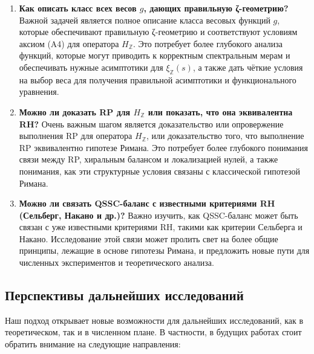 \documentclass{article}
\numberwithin{equation}{section}
\theoremstyle{plain}
\theoremstyle{definition}
\theoremstyle{remark}
\begin{document}
\begin{enumerate}[label=(\arabic*)]
    \item \textbf{Как описать класс всех весов \( g \), дающих правильную ζ-геометрию?}
    \noindent
    Важной задачей является полное описание класса весовых функций \( g \), которые обеспечивают правильную ζ-геометрию и соответствуют условиям аксиом (A4) для оператора \( H_{\mathbb{Z}} \). Это потребует более глубокого анализа функций, которые могут приводить к корректным спектральным мерам и обеспечивать нужные асимптотики для \( \xi_{\mathbb{Z}}(s) \), а также дать чёткие условия на выбор веса для получения правильной асимптотики и функционального уравнения.
    
    \item \textbf{Можно ли доказать RP для \( H_{\mathbb{Z}} \) или показать, что она эквивалентна RH?}
    \noindent
    Очень важным шагом является доказательство или опровержение выполнения RP для оператора \( H_{\mathbb{Z}} \), или доказательство того, что выполнение RP эквивалентно гипотезе Римана. Это потребует более глубокого понимания связи между RP, хиральным балансом и локализацией нулей, а также понимания, как эти структурные условия связаны с классической гипотезой Римана.
    
    \item \textbf{Можно ли связать QSSC-баланс с известными критериями RH (Сельберг, Накано и др.)?}
    \noindent
    Важно изучить, как QSSC-баланс может быть связан с уже известными критериями RH, такими как критерии Сельберга и Накано. Исследование этой связи может пролить свет на более общие принципы, лежащие в основе гипотезы Римана, и предложить новые пути для численных экспериментов и теоретического анализа.
\end{enumerate}

\subsection{Перспективы дальнейших исследований}
\label{subsec:future-research}

\noindent
Наш подход открывает новые возможности для дальнейших исследований, как в теоретическом, так и в численном плане. В частности, в будущих работах стоит обратить внимание на следующие направления:
\end{document}
